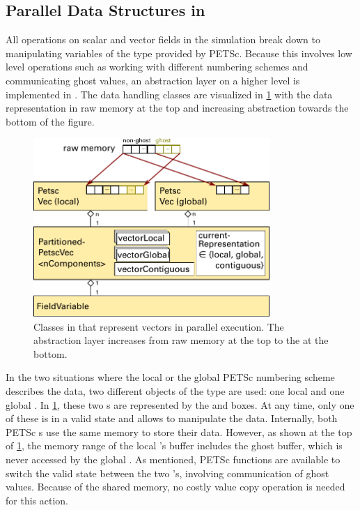 \subsection{Parallel Data Structures in \Opendihu{}}\label{sec:paralel_data_structures_in_opendihu}

All operations on scalar and vector fields in the simulation break down to manipulating variables of the \Vec{} type provided by PETSc. 
Because this involves low level operations such as working with different numbering schemes and communicating ghost values, an abstraction layer on a higher level is implemented in \opendihu{}. The data handling classes are visualized in \cref{fig:partitioned_petsc_vec} with the data representation in raw memory at the top and increasing abstraction towards the bottom of the figure.

\begin{figure}%
  \centering%
  \includegraphics[width=0.8\textwidth]{images/implementation/partitioned_petsc_vec.pdf}%
  \caption{Classes in \opendihu{} that represent vectors in parallel execution. The abstraction layer increases from raw memory at the top to the  at the bottom.}%
  \label{fig:partitioned_petsc_vec}%
\end{figure}%

In the two situations where the local or the global PETSc numbering scheme describes the data, two different objects of the \Vec{} type are used: one local and one global \Vec{}. In \cref{fig:partitioned_petsc_vec}, these two \Vec{}s are represented by the  and  boxes. At any time, only one of these is in a valid state and allows to manipulate the data. Internally, both PETSc \Vec{}s use the same memory to store their data. However, as shown at the top of \cref{fig:partitioned_petsc_vec}, the memory range of the local \Vec{}'s buffer includes the ghost buffer, which is never accessed by the global \Vec{}. As mentioned, PETSc functions are available to switch the valid state between the two \Vec{}'s, involving communication of ghost values. Because of the shared memory, no costly value copy operation is needed for this action.

